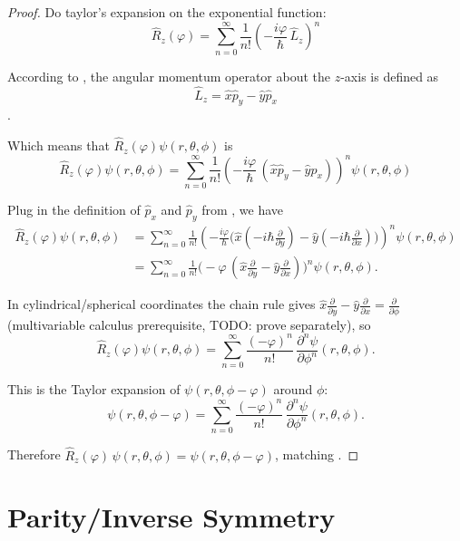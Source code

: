 \documentclass[12pt]{article}
\begin{document}
\begin{proof}
  Do taylor's expansion on the exponential function:
  \[\hat{R}_z(\varphi) = \sum_{n=0}^{\infty} \frac{1}{n!} \left(-\frac{i\varphi}{\hbar}\,\hat{L}_z\right)^n\]

  According to , the angular momentum operator about the $z$-axis is defined as
  \[\hat{L}_z = \hat x \hat p_y - \hat y \hat p_x\]. 

  Which means that $\hat{R}_z(\varphi) \psi(r, \theta, \phi)$ is 
\[\hat{R}_z(\varphi) \psi(r, \theta, \phi) = \sum_{n=0}^{\infty} \frac{1}{n!} \left(-\frac{i\varphi}{\hbar}\,(\hat x \hat p_y - \hat y \hat p_x)\right)^n \psi(r, \theta, \phi)\] 

  Plug in the definition of $\hat p_x$ and $\hat p_y$ from , we have
  \begin{align*}
    \hat{R}_z(\varphi) \psi(r, \theta, \phi) &= \sum_{n=0}^{\infty} \frac{1}{n!} \left(-\frac{i\varphi}{\hbar}\bigl(\hat x (-i\hbar \tfrac{\partial}{\partial y}) - \hat y (-i\hbar \tfrac{\partial}{\partial x})\bigr)\right)^n \psi(r, \theta, \phi)\\
    &= \sum_{n=0}^{\infty} \frac{1}{n!} \bigl(-\varphi\,(\hat x \tfrac{\partial}{\partial y} - \hat y \tfrac{\partial}{\partial x})\bigr)^n \psi(r, \theta, \phi).
  \end{align*}

  {\color{blue}In cylindrical/spherical coordinates the chain rule gives $\hat x \tfrac{\partial}{\partial y} - \hat y \tfrac{\partial}{\partial x} = \tfrac{\partial}{\partial \phi}$ (multivariable calculus prerequisite, TODO: prove separately),} so
  \[
    \hat{R}_z(\varphi) \psi(r, \theta, \phi) = \sum_{n=0}^{\infty} \frac{(-\varphi)^n}{n!}\,\frac{\partial^n \psi}{\partial \phi^n}(r, \theta, \phi).
  \]

  This is the Taylor expansion of $\psi(r, \theta, \phi - \varphi)$ around $\phi$:
  \[
    \psi(r, \theta, \phi - \varphi) = \sum_{n=0}^{\infty} \frac{(-\varphi)^n}{n!}\,\frac{\partial^n \psi}{\partial \phi^n}(r, \theta, \phi).
  \]

  Therefore $\hat{R}_z(\varphi)\,\psi(r,\theta,\phi) = \psi(r,\theta,\phi-\varphi)$, matching .
\end{proof}

\section{Parity/Inverse Symmetry}
\end{document}
